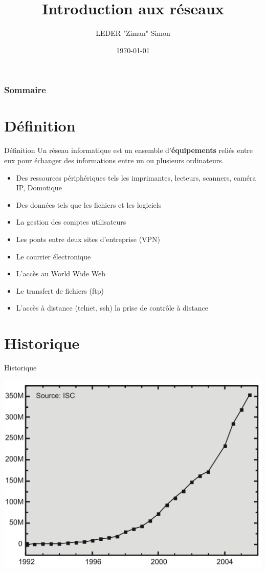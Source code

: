 \documentclass{beamer}
\title{Introduction aux réseaux}
\author{LEDER "Ziman" Simon}
\institute{Rezoleo\\}
\date{\today}
\begin{document}
	
	\maketitle

	\begin{frame}
		\frametitle{Sommaire} 
		\tableofcontents
	\end{frame}

\section{Définition}
	
	\begin{frame}{Définition}
		Un réseau informatique est un ensemble d'\textbf{équipements} reliés entre eux pour échanger des informations entre un ou plusieurs ordinateurs. \\
		\begin{itemize}[<+->]
			\item Des ressources périphériques tels les imprimantes, lecteurs, scanners, caméra IP, Domotique
			\item Des données tels que les fichiers et les logiciels 
			\item La gestion des comptes utilisateurs
			\item Les ponts entre deux sites d’entreprise (VPN) 
			\item Le courrier électronique
			\item L’accès au World Wide Web
			\item Le transfert de fichiers (ftp)
			\item L’accès à distance (telnet, ssh) la prise de contrôle à distance
		\end{itemize}
	\end{frame}

\section{Historique}

	\begin{frame}{Historique}
		\begin{center}
			\includegraphics[scale=0.7]{Utilisation.png}
		\end{center}
	\end{frame}
\end{document}

